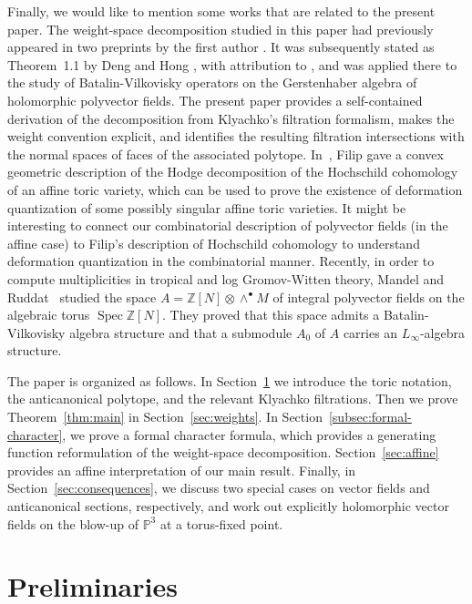 \documentclass[colorlinks,11pt,reqno]{amsart}
\theoremstyle{definition}
\theoremstyle{remark}
\numberwithin{equation}{section}
\numberwithin{equation}{section}
\newcommand{\Z}{\mathbb{Z}}
\begin{document}
Finally, we would like to mention some works that are related to the present paper.
The weight-space decomposition studied in this paper had previously appeared in two preprints by the first author \cite{HongPoisson, HongPolyvector}. It was subsequently stated as
Theorem~1.1 by Deng and Hong \cite{Deng-Hong 21}, with attribution to \cite{HongPolyvector}, and was applied there to the study of Batalin-Vilkovisky operators on the Gerstenhaber algebra of
holomorphic polyvector fields. The present paper provides a self-contained derivation of the decomposition from Klyachko's filtration formalism, makes the weight convention explicit, and identifies the resulting filtration intersections with the normal spaces of faces of the associated polytope.
In~\cite{Filip}, Filip gave a convex geometric description of the Hodge decomposition of the Hochschild cohomology of an affine toric variety, which can be used to prove the existence of deformation quantization of some possibly singular affine toric varieties. It might be interesting to connect our combinatorial description of polyvector fields (in the affine case) to Filip's description of Hochschild cohomology to understand deformation quantization in the combinatorial manner.
Recently, in order to compute multiplicities in tropical and log Gromov-Witten theory, Mandel and Ruddat~\cite{M-R 19} studied the space $A = \Z[N] \otimes \wedge^\bullet M$ of integral polyvector fields on the algebraic torus $\operatorname{Spec}\Z[N]$. They proved that this space admits a Batalin-Vilkovisky algebra structure and that a submodule $A_0$ of $A$ carries an $L_\infty$-algebra structure.


The paper is organized as follows.
In Section~\ref{sec:preliminaries} we introduce the toric notation, the anticanonical polytope, and the relevant Klyachko filtrations.
Then we prove Theorem~\ref{thm:main} in Section~\ref{sec:weights}.
In Section~\ref{subsec:formal-character}, we  prove a formal character formula, which provides a generating function reformulation of the weight-space decomposition.
Section~\ref{sec:affine} provides an affine interpretation of our main result.
Finally, in Section~\ref{sec:consequences}, we discuss two special cases on vector fields and anticanonical sections, respectively, and work out explicitly holomorphic vector fields on the blow-up of \(\mathbb P^3\) at a torus-fixed point.

\section{Preliminaries}\label{sec:preliminaries}
\end{document}
